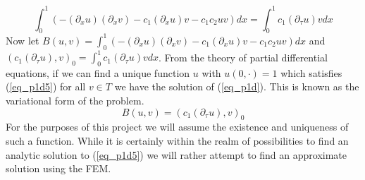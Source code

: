 \documentclass[11pt,fleqn]{article}
\theoremstyle{defstyle}
\begin{document}
\begin{equation}
\int_0^1 (-(\partial_xu)(\partial_xv) - c_1(\partial_xu)v - c_1c_2uv)dx = \int^1_0 c_1(\partial_{\tau}u)v dx
\label{eq_p1d4}
\end{equation}
Now let $B(u, v) = \int_0^1 (-(\partial_xu)(\partial_xv) - c_1(\partial_xu)v - c_1c_2uv)dx$ and $(c_1(\partial_{\tau}u),v)_0 = \int^1_0 c_1(\partial_{\tau}u)v dx$. From the theory of partial differential equations, if we can find a unique function $u$ with $u(0, \cdot)=1$ which satisfies (\ref{eq_p1d5}) for all $v \in T$ we have the solution of (\ref{eq_p1d}). This is known as the variational form of the problem. 
\begin{equation}
B(u, v) = (c_1(\partial_{\tau}u),v)_0
\label{eq_p1d5}
\end{equation}
For the purposes of this project we will assume the existence and uniqueness of such a function. While it is certainly within the realm of possibilities to find an analytic solution to (\ref{eq_p1d5}) we will rather attempt to find an approximate solution using the FEM.
\end{document}
